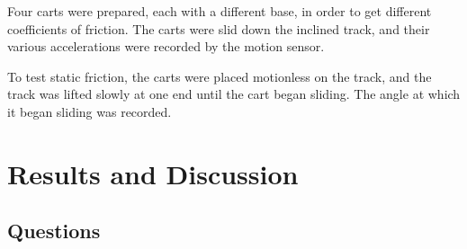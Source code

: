 Four carts were prepared, each with a different base, in order to get different coefficients of friction.
The carts were slid down the inclined track, and their various accelerations were recorded by the motion sensor.

To test static friction, the carts were placed motionless on the track, and the track was lifted slowly at one end until the cart began sliding.
The angle at which it began sliding was recorded.

\section{Results and Discussion}

\subsection{Questions}


